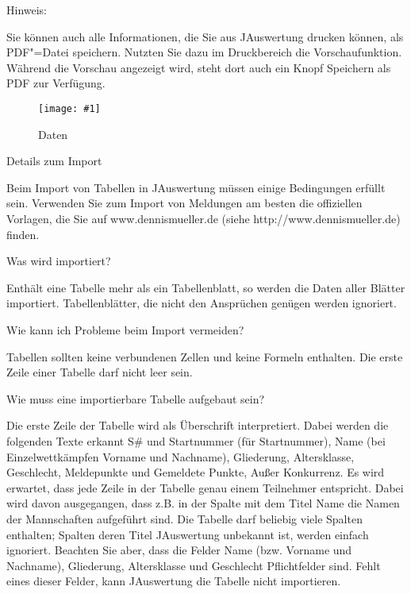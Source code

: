 \documentclass[11pt,a4paper,twoside,ngerman]{article}
\newcommand{\hsmimage}[3]{\begin{figure}[!ht]\centering\texttt{[image: \#1]}\caption{#3}\end{figure}}
\begin{document}
\begin{bfseries}Hinweis:\end{bfseries} Sie können auch alle Informationen, die Sie aus JAuswertung drucken können, als PDF"=Datei speichern. Nutzten Sie dazu im Druckbereich die Vorschaufunktion. Während die Vorschau angezeigt wird, steht dort auch ein Knopf \glqq{}Speichern als PDF\grqq{} zur Verfügung.


\hsmimage{pics/importieren-daten}{.49\textwidth}{Daten}
\begin{bfseries}Details zum Import\end{bfseries}

Beim Import von Tabellen in JAuswertung müssen einige Bedingungen erfüllt sein. Verwenden Sie zum Import von Meldungen am besten die offiziellen Vorlagen, die Sie auf www.dennismueller.de (siehe http://www.dennismueller.de) finden.

\begin{bfseries}Was wird importiert?\end{bfseries} Enthält eine Tabelle mehr als ein Tabellenblatt, so werden die Daten aller Blätter importiert. Tabellenblätter, die nicht den Ansprüchen genügen werden ignoriert. 

\begin{bfseries}Wie kann ich Probleme beim Import vermeiden?\end{bfseries} Tabellen sollten keine verbundenen Zellen und keine Formeln enthalten. Die erste Zeile einer Tabelle darf nicht leer sein.

\begin{bfseries}Wie muss eine importierbare Tabelle aufgebaut sein?\end{bfseries} Die erste Zeile der Tabelle wird als Überschrift interpretiert. Dabei werden die folgenden Texte erkannt \glqq{}S\#\grqq{} und \glqq{}Startnummer\grqq{} (für Startnummer), \glqq{}Name\grqq{} (bei Einzelwettkämpfen \glqq{}Vorname\grqq{} und \glqq{}Nachname\grqq{}), \glqq{}Gliederung\grqq{}, \glqq{}Altersklasse\grqq{}, \glqq{}Geschlecht\grqq{}, \glqq{}Meldepunkte\grqq{} und \glqq{}Gemeldete Punkte\grqq{}, \glqq{}Außer Konkurrenz\grqq{}. Es wird erwartet, dass jede Zeile in der Tabelle genau einem Teilnehmer entspricht. Dabei wird davon ausgegangen, dass z.B. in der Spalte mit dem Titel \glqq{}Name\grqq{} die Namen der Mannschaften aufgeführt sind. Die Tabelle darf beliebig viele Spalten enthalten; Spalten deren Titel JAuswertung unbekannt ist, werden einfach ignoriert. Beachten Sie aber, dass die Felder \glqq{}Name\grqq{} (bzw. \glqq{}Vorname\grqq{} und \glqq{}Nachname\grqq{}), \glqq{}Gliederung\grqq{}, \glqq{}Altersklasse\grqq{} und \glqq{}Geschlecht\grqq{} Pflichtfelder sind. Fehlt eines dieser Felder, kann JAuswertung die Tabelle nicht importieren. 
\end{document}
